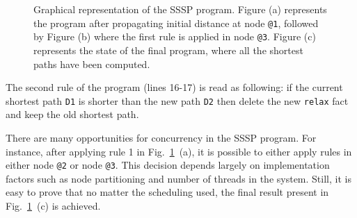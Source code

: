\begin{figure}[ht]
\begin{center}
  \hspace{0.4cm}
  \hspace{0.4cm}
\end{center}
\caption{Graphical representation of the SSSP program. Figure (a) represents the
   program after propagating initial distance at node \texttt{@1}, followed by
   Figure (b) where the first rule is applied in node \texttt{@3}. Figure (c)
   represents the state of the final program, where all the shortest paths
   have been computed.}
\label{fig:shortest_path_program}
\end{figure}

The second rule of the program (lines 16-17) is read as following: if the
current shortest path \texttt{D1} is shorter than the new path \texttt{D2} then
delete the new \texttt{relax} fact and keep the old shortest path.

There are many opportunities for concurrency in the SSSP program. For instance,
after applying rule 1 in Fig.~\ref{fig:shortest_path_program}~(a), it is
possible to either apply rules in either node \texttt{@2} or node
\texttt{@3}. This decision depends largely on implementation factors such as node
partitioning and number of threads in the system.
Still, it is easy to prove that no matter the scheduling used,
the final result present in Fig.~\ref{fig:shortest_path_program}~(c) is achieved.

